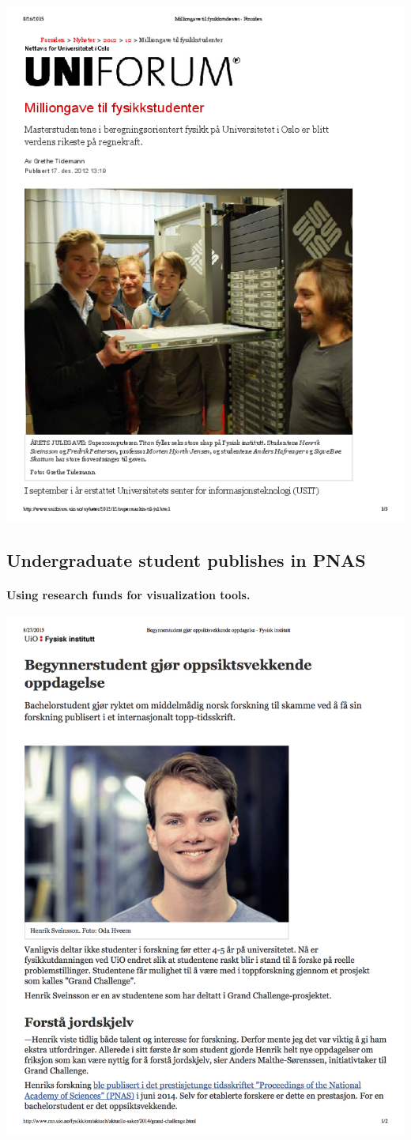 \documentclass[%
oneside,                 %
final,                   %
10pt]{article}
\begin{document}
\centerline{\includegraphics[width=0.7\linewidth]{fig-future/uniforum-0.png}}




\subsection*{Undergraduate student publishes in PNAS}

\paragraph{Using research funds for visualization tools.}


\centerline{\includegraphics[width=0.7\linewidth]{fig-future/pnas.png}}
\end{document}
